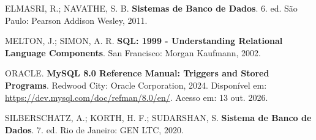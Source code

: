 \vspace{0.8em}
\noindent ELMASRI, R.; NAVATHE, S. B. \textbf{Sistemas de Banco de Dados}. 6. ed. São Paulo: Pearson Addison Wesley, 2011.

\vspace{0.8em}
\noindent MELTON, J.; SIMON, A. R. \textbf{SQL: 1999 - Understanding Relational Language Components}. San Francisco: Morgan Kaufmann, 2002.

\vspace{0.8em}
\noindent ORACLE. \textbf{MySQL 8.0 Reference Manual: Triggers and Stored Programs}. Redwood City: Oracle Corporation, 2024. Disponível em: \url{https://dev.mysql.com/doc/refman/8.0/en/}. Acesso em: 13 out. 2026.

\vspace{0.8em}
\noindent SILBERSCHATZ, A.; KORTH, H. F.; SUDARSHAN, S. \textbf{Sistema de Banco de Dados}. 7. ed. Rio de Janeiro: GEN LTC, 2020.
